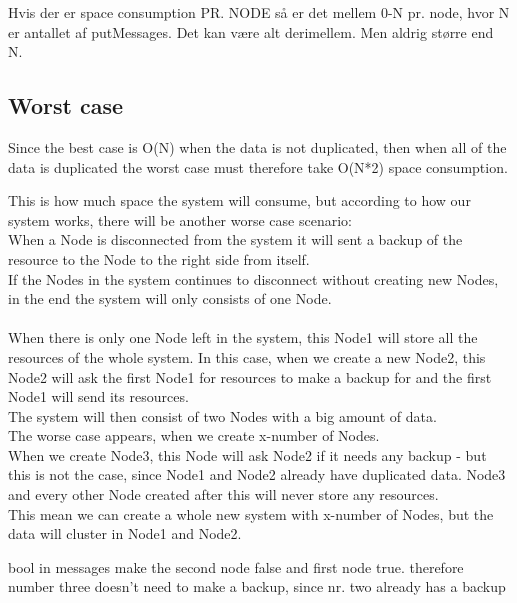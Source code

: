 Hvis der er space consumption PR. NODE så er det mellem 0-N pr. node, hvor N er antallet af putMessages. Det kan være alt derimellem. Men aldrig større end N.


\subsection{Worst case}
Since the best case is O(N) when the data is not duplicated, then when all of the data is duplicated the worst case must therefore take O(N*2) space consumption. \\


This is how much space the system will consume, but according to how our system works, there will be another worse case scenario: \\
When a Node is disconnected from the system it will sent a backup of the resource to the Node to the right side from itself. \\
If the Nodes in the system continues to disconnect without creating new Nodes, in the end the system will only consists of one Node. \\\\
When there is only one Node left in the system, this Node1 will store all the resources of the whole system. In this case, when we create a new Node2, this Node2 will ask the first Node1 for resources to make a backup for and the first Node1 will send its resources. \\ The system will then consist of two Nodes with a big amount of data.\\
The worse case appears, when we create x-number of Nodes. \\
When we create Node3, this Node will ask Node2 if it needs any backup - but this is not the case, since Node1 and Node2 already have duplicated data. Node3 and every other Node created after this will never store any resources.\\
This mean we can create a whole new system with x-number of Nodes, but the data will cluster in Node1 and Node2. 


bool in messages make the second node false and first node true. therefore number three doesn't need to make a backup, since nr. two already has a backup 



